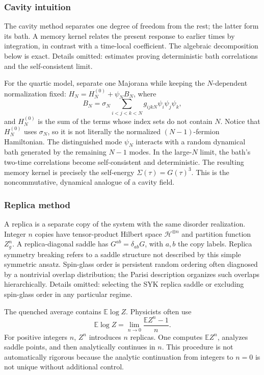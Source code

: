 \documentclass[11pt]{article}
\numberwithin{equation}{section}
\theoremstyle{exposition}
\theoremstyle{result}
\newcommand{\E}{\mathbb E}
\begin{document}
\subsubsection{Cavity intuition}


The cavity method separates one degree of freedom from the rest; the latter form its bath. A memory kernel relates the present response to earlier times by integration, in contrast with a time-local coefficient. The algebraic decomposition below is exact. Details omitted: estimates proving deterministic bath correlations and the self-consistent limit.

For the quartic model, separate one Majorana while keeping the $N$-dependent normalization fixed: $H_N=H_N^{(0)}+\psi_N B_N$, where
\begin{equation*}
B_N=\sigma_N\sum_{i<j<k<N}g_{ijkN}\psi_i\psi_j\psi_k,
\end{equation*}
and $H_N^{(0)}$ is the sum of the terms whose index sets do not contain $N$. Notice that $H_N^{(0)}$ uses $\sigma_N$, so it is not literally the normalized $(N-1)$-fermion Hamiltonian.
The distinguished mode $\psi_N$ interacts with a random dynamical bath generated by the remaining $N-1$ modes. In the large-$N$ limit, the bath's two-time correlations become self-consistent and deterministic. The resulting memory kernel is precisely the self-energy $\Sigma(\tau)=G(\tau)^3$. This is the noncommutative, dynamical analogue of a cavity field.

\subsubsection{Replica method}


A replica is a separate copy of the system with the same disorder realization. Integer $n$ copies have tensor-product Hilbert space $\mathcal H^{\otimes n}$ and partition function $Z_g^n$. A replica-diagonal saddle has $G^{ab}=\delta_{ab}G$, with $a,b$ the copy labels. Replica symmetry breaking refers to a saddle structure not described by this simple symmetric ansatz. Spin-glass order is persistent random ordering often diagnosed by a nontrivial overlap distribution; the Parisi description organizes such overlaps hierarchically. Details omitted: selecting the SYK replica saddle or excluding spin-glass order in any particular regime.

The quenched average contains $\E\log Z$. Physicists often use
\begin{equation}
\E\log Z
=\lim_{n\to0}\frac{\E Z^n-1}{n}.
\label{eq:replica}
\end{equation}
For positive integers $n$, $Z^n$ introduces $n$ replicas. One computes $\E Z^n$, analyzes saddle points, and then analytically continues in $n$. This procedure is not automatically rigorous because the analytic continuation from integers to $n=0$ is not unique without additional control.
\end{document}
